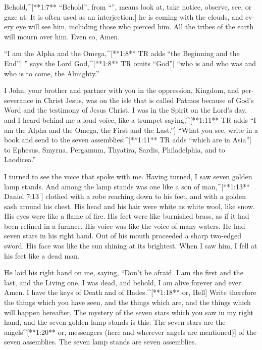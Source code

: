 \begin{paracols}{2}
\begin{english}
 Behold,^[**1:7** “Behold”, from “”, means look at, take notice, observe, see, or gaze at. It is often used as an interjection.] he is coming with the clouds, and every eye will see him, including those who pierced him. All the tribes of the earth will mourn over him. Even so, Amen. 

 “I am the Alpha and the Omega,^[**1:8** TR adds “the Beginning and the End”] ” says the Lord God,^[**1:8** TR omits “God”] “who is and who was and who is to come, the Almighty.” 

 I John, your brother and partner with you in the oppression, Kingdom, and perseverance in Christ Jesus, was on the isle that is called Patmos because of God’s Word and the testimony of Jesus Christ.  I was in the Spirit on the Lord’s day, and I heard behind me a loud voice, like a trumpet  saying,^[**1:11** TR adds “I am the Alpha and the Omega, the First and the Last.”] “What you see, write in a book and send to the seven assemblies:^[**1:11** TR adds “which are in Asia”] to Ephesus, Smyrna, Pergamum, Thyatira, Sardis, Philadelphia, and to Laodicea.” 

 I turned to see the voice that spoke with me. Having turned, I saw seven golden lamp stands.  And among the lamp stands was one like a son of man,^[**1:13** Daniel 7:13 ] clothed with a robe reaching down to his feet, and with a golden sash around his chest.  His head and his hair were white as white wool, like snow. His eyes were like a flame of fire.  His feet were like burnished brass, as if it had been refined in a furnace. His voice was like the voice of many waters.  He had seven stars in his right hand. Out of his mouth proceeded a sharp two-edged sword. His face was like the sun shining at its brightest.  When I saw him, I fell at his feet like a dead man. 

He laid his right hand on me, saying, “Don’t be afraid. I am the first and the last,  and the Living one. I was dead, and behold, I am alive forever and ever. Amen. I have the keys of Death and of Hades.^[**1:18** or, Hell]  Write therefore the things which you have seen, and the things which are, and the things which will happen hereafter.  The mystery of the seven stars which you saw in my right hand, and the seven golden lamp stands is this: The seven stars are the angels^[**1:20** or, messengers (here and wherever angels are mentioned)] of the seven assemblies. The seven lamp stands are seven assemblies.


\end{english}
\end{paracols}
